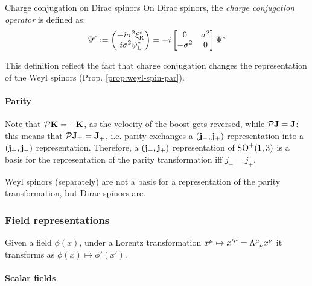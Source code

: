\begin{definition}{Charge conjugation on Dirac spinors}{}
  On Dirac spinors, the \textit{charge conjugation operator} is defined as:
  \begin{equation}
    \Psi^c \defeq
    \begin{pmatrix}
      - i \sigma^2 \xi_\text{R}^* \\
      i \sigma^2 \psi_\text{L}^*
    \end{pmatrix}
    = -i
    \begin{bmatrix}
      0 & \sigma^2 \\ -\sigma^2 & 0
    \end{bmatrix}
    \Psi^*
    \label{eq:1.43}
  \end{equation}
\end{definition}

This definition reflect the fact that charge conjugation changes the representation of the Weyl spinors (Prop. \ref{prop:weyl-spin-par}).

\paragraph{Parity}

Note that $ \mathcal{P} \mathbf{K} = -\mathbf{K} $, as the velocity of the boost gets reversed, while $ \mathcal{P} \mathbf{J} = \mathbf{J} $: this means that $ \mathcal{P} \mathbf{J}_\pm = \mathbf{J}_\mp $, i.e. parity exchanges a $ \mathbf{\left( j_-,j_+ \right)} $ representation into a $ \mathbf{\left( j_+,j_- \right)} $ representation. Therefore, a $ \mathbf{\left( j_-,j_+ \right)} $ representation of $ \mathrm{SO}^+(1,3) $ is a basis for the representation of the parity transformation iff $ j_- = j_+ $.

\begin{example}{}{}
  Weyl spinors (separately) are not a basis for a representation of the parity transformation, but Dirac spinors are.
\end{example}

\subsubsection{Field representations}

Given a field $ \phi(x) $, under a Lorentz transformation $ x^\mu \mapsto {x'}^\mu = \tensor{\Lambda}{^\mu_\nu} x^\nu $ it transforms as $ \phi(x) \mapsto \phi'(x') $.

\paragraph{Scalar fields}

